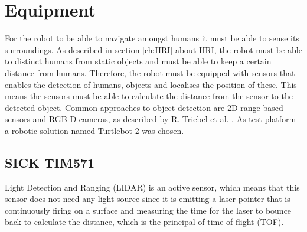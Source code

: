 \chapter{Equipment} \label{ch:equipment}
For the robot to be able to navigate amongst humans it must be able to sense its surroundings. As described in section \ref{ch:HRI} about HRI, the robot must be able to distinct humans from static objects and must be able to keep a certain distance from humans. Therefore, the robot must be equipped with sensors that enables the detection of humans, objects and localises the position of these. This means the sensors must be able to calculate the distance from the sensor to the detected object. Common approaches to object detection are 2D range-based sensors and RGB-D cameras, as described by R. Triebel et al. \cite{SPENCER_paper}. As test platform a robotic solution named Turtlebot 2 was chosen.\\


\section{SICK TIM571}
Light Detection and Ranging (LIDAR) is an active sensor, which means that this sensor does not need any light-source since it is emitting a laser pointer that is continuously firing on a surface and measuring the time for the laser to bounce back to calculate the distance, which is the principal of time of flight (TOF). 
 
